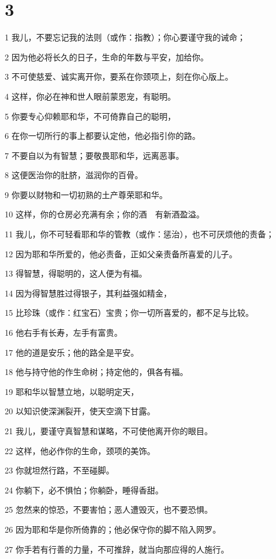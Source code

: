\chapter{3}

\par 1 我儿，不要忘记我的法则（或作：指教）；你心要谨守我的诫命；
\par 2 因为他必将长久的日子，生命的年数与平安，加给你。
\par 3 不可使慈爱、诚实离开你，要系在你颈项上，刻在你心版上。
\par 4 这样，你必在神和世人眼前蒙恩宠，有聪明。
\par 5 你要专心仰赖耶和华，不可倚靠自己的聪明，
\par 6 在你一切所行的事上都要认定他，他必指引你的路。
\par 7 不要自以为有智慧；要敬畏耶和华，远离恶事。
\par 8 这便医治你的肚脐，滋润你的百骨。
\par 9 你要以财物和一切初熟的土产尊荣耶和华。
\par 10 这样，你的仓房必充满有余；你的酒　有新酒盈溢。
\par 11 我儿，你不可轻看耶和华的管教（或作：惩治），也不可厌烦他的责备；
\par 12 因为耶和华所爱的，他必责备，正如父亲责备所喜爱的儿子。
\par 13 得智慧，得聪明的，这人便为有福。
\par 14 因为得智慧胜过得银子，其利益强如精金，
\par 15 比珍珠（或作：红宝石）宝贵；你一切所喜爱的，都不足与比较。
\par 16 他右手有长寿，左手有富贵。
\par 17 他的道是安乐；他的路全是平安。
\par 18 他与持守他的作生命树；持定他的，俱各有福。
\par 19 耶和华以智慧立地，以聪明定天，
\par 20 以知识使深渊裂开，使天空滴下甘露。
\par 21 我儿，要谨守真智慧和谋略，不可使他离开你的眼目。
\par 22 这样，他必作你的生命，颈项的美饰。
\par 23 你就坦然行路，不至碰脚。
\par 24 你躺下，必不惧怕；你躺卧，睡得香甜。
\par 25 忽然来的惊恐，不要害怕；恶人遭毁灭，也不要恐惧。
\par 26 因为耶和华是你所倚靠的；他必保守你的脚不陷入网罗。
\par 27 你手若有行善的力量，不可推辞，就当向那应得的人施行。
